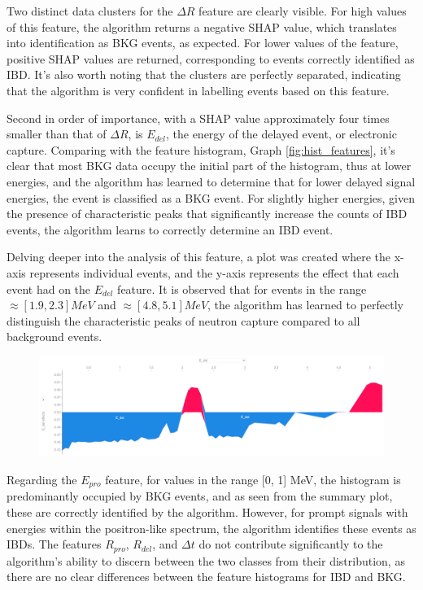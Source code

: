 Two distinct data clusters for the $\Delta R$ feature are clearly visible. For high values of this feature, the algorithm returns a negative SHAP value, which translates into identification as BKG events, as expected. For lower values of the feature, positive SHAP values are returned, corresponding to events correctly identified as IBD. It's also worth noting that the clusters are perfectly separated, indicating that the algorithm is very confident in labelling events based on this feature.

Second in order of importance, with a SHAP value approximately four times smaller than that of $\Delta R$, is $E_{del}$, the energy of the delayed event, or electronic capture. Comparing with the feature histogram, Graph \ref{fig:hist_features}, it's clear that most BKG data occupy the initial part of the histogram, thus at lower energies, and the algorithm has learned to determine that for lower delayed signal energies, the event is classified as a BKG event. For slightly higher energies, given the presence of characteristic peaks that significantly increase the counts of IBD events, the algorithm learns to correctly determine an IBD event. 

Delving deeper into the analysis of this feature, a plot was created where the x-axis represents individual events, and the y-axis represents the effect that each event had on the $E_{del}$ feature. It is observed that for events in the range $\approx[1.9, 2.3] MeV$ and $\approx[4.8, 5.1] MeV$, the algorithm has learned to perfectly distinguish the characteristic peaks of neutron capture compared to all background events.

\begin{figure}[h!]
	\centering
	\includegraphics[width=\linewidth]{Images/Shap/E_del_force_plot.png}
	\label{fig:E_del_force_plot}
\end{figure}

Regarding the $E_{pro}$ feature, for values in the range [0, 1] MeV, the histogram is predominantly occupied by BKG events, and as seen from the summary plot, these are correctly identified by the algorithm. However, for prompt signals with energies within the positron-like spectrum, the algorithm identifies these events as IBDs. The features $R_{pro}$, $R_{del}$, and $\Delta t$ do not contribute significantly to the algorithm's ability to discern between the two classes from their distribution, as there are no clear differences between the feature histograms for IBD and BKG.



